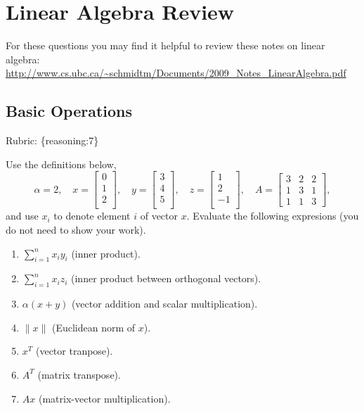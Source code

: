 \documentclass{article}
\def\rubric#1{\gre{Rubric: \{#1\}}}{}
\def\blu#1{{\color{blu}#1}}
\def\gre#1{{\color{gre}#1}}
\def\norm#1{\|#1\|}
\def\enum#1{\begin{enumerate}#1\end{enumerate}}
\begin{document}
\section{Linear Algebra Review}

For these questions you may find it helpful to review these notes on linear algebra:\\
\url{http://www.cs.ubc.ca/~schmidtm/Documents/2009_Notes_LinearAlgebra.pdf}

\subsection{Basic Operations}
\rubric{reasoning:7}

Use the definitions below,
\[
\alpha = 2,\quad
x = \left[\begin{array}{c}

0\\
1\\
2\\

\end{array}\right], \quad 
y = \left[\begin{array}{c}
3\\
4\\
5\\
\end{array}\right],\quad
z = \left[\begin{array}{c}
1\\
2\\
-1\\
\end{array}\right],\quad
A = \left[\begin{array}{ccc}
3 & 2 & 2\\
1 & 3 & 1\\
1 & 1 & 3
\end{array}\right],
\]
and use $x_i$ to denote element $i$ of vector $x$.
\blu{Evaluate the following expresions} (you do not need to show your work).
\enum{
\item $\sum_{i=1}^n x_iy_i$ (inner product).
\item $\sum_{i=1}^n x_iz_i$ (inner product between orthogonal vectors).
\item $\alpha(x+y)$ (vector addition and scalar multiplication).
\item $\norm{x}$ (Euclidean norm of $x$).
\item $x^T$ (vector tranpose).
\item $A^T$ (matrix transpose).
\item $Ax$ (matrix-vector multiplication).
}
\end{document}
